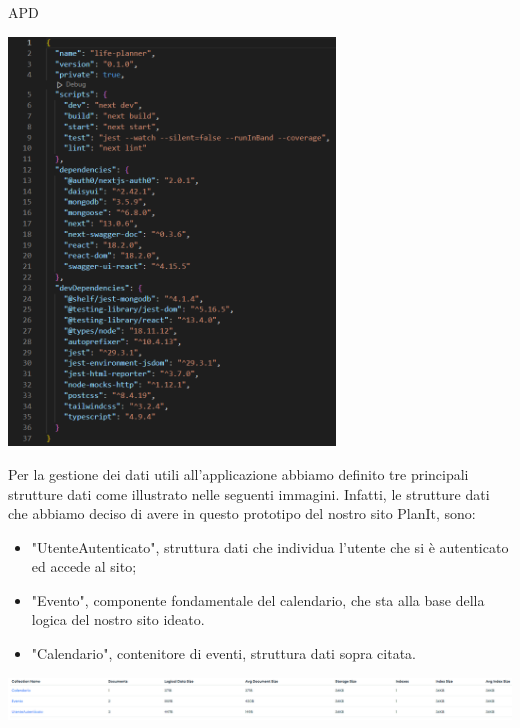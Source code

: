 \begin{listaPersonale} {APD}
\begin{center}
        \includegraphics[width=0.65\textwidth, height=0.55\textheight]{img/png/package_json.png}
    \end{center}
    \newpage
    Per la gestione dei dati utili all'applicazione abbiamo definito tre principali strutture dati come illustrato nelle seguenti immagini. Infatti, le strutture dati che abbiamo deciso di avere in questo prototipo del nostro sito PlanIt, sono:
    \begin{itemize}
        \item "UtenteAutenticato", struttura dati che individua l'utente che si è autenticato ed accede al sito;
        \item "Evento", componente fondamentale del calendario, che sta alla base della logica del nostro sito ideato.
        \item "Calendario", contenitore di eventi, struttura dati sopra citata.
    \end{itemize}
    \begin{center}
        \includegraphics[width=1.1\textwidth, height=0.05\textheight]{img/png/DB/collections.png}

\end{center}
\end{listaPersonale}
